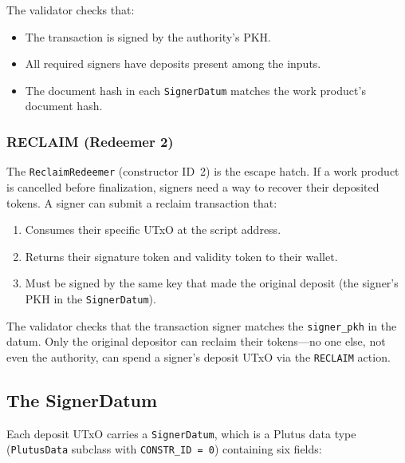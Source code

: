 The validator checks that:
\begin{itemize}[nosep]
  \item The transaction is signed by the authority's PKH.
  \item All required signers have deposits present among the inputs.
  \item The document hash in each \texttt{SignerDatum} matches the work
    product's document hash.
\end{itemize}

\subsubsection{RECLAIM (Redeemer 2)}

The \texttt{ReclaimRedeemer} (constructor ID~2) is the escape hatch. If
a work product is cancelled before finalization, signers need a way to
recover their deposited tokens. A signer can submit a reclaim
transaction that:
\begin{enumerate}[nosep]
  \item Consumes their specific UTxO at the script address.
  \item Returns their signature token and validity token to their wallet.
  \item Must be signed by the same key that made the original deposit
    (the signer's PKH in the \texttt{SignerDatum}).
\end{enumerate}

The validator checks that the transaction signer matches the
\texttt{signer\_pkh} in the datum. Only the original depositor can
reclaim their tokens---no one else, not even the authority, can spend a
signer's deposit UTxO via the \texttt{RECLAIM} action.

\subsection{The SignerDatum}

Each deposit UTxO carries a \texttt{SignerDatum}, which is a Plutus
data type (\texttt{PlutusData} subclass with \texttt{CONSTR\_ID = 0})
containing six fields:

